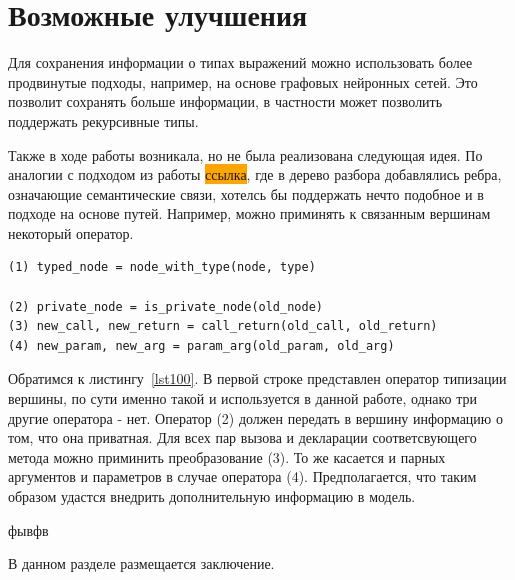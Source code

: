\documentclass[times,specification,annotation]{itmo-student-thesis}
\begin{document}
\section{Возможные улучшения}
Для сохранения информации о типах выражений можно использовать более продвинутые подходы, например, на основе графовых нейронных сетей. Это позволит сохранять больше информации, в частности может позволить поддержать рекурсивные типы.

Также в ходе работы возникала, но не была реализована следующая идея. По аналогии с подходом из работы  \colorbox{orange}{ссылка}, где в дерево разбора добавлялись ребра, означающие семантические связи, хотелсь бы поддержать нечто подобное и в подходе на основе путей. Например, можно приминять к связанным вершинам некоторый оператор.

\begin{lstlisting}[float=!h,caption={Примеры семантических операторов},label={lst100}]
(1) typed_node = node_with_type(node, type)

(2) private_node = is_private_node(old_node)
(3) new_call, new_return = call_return(old_call, old_return)
(4) new_param, new_arg = param_arg(old_param, old_arg)
\end{lstlisting}

Обратимся к листингу~\ref{lst100}. В первой строке представлен оператор типизации вершины, по сути именно такой и используется в данной работе, однако три другие оператора - нет. Оператор (2) должен передать в вершину информацию о том, что она приватная. Для всех пар вызова и декларации соответсвующего метода можно приминить преобразование (3). То же касается и парных аргументов и параметров в случае оператора (4). Предполагается, что таким образом удастся внедрить дополнительную информацию в модель.

\chapterconclusion
фывфв


\startconclusionpage

В данном разделе размещается заключение.

\printmainbibliography
\end{document}
